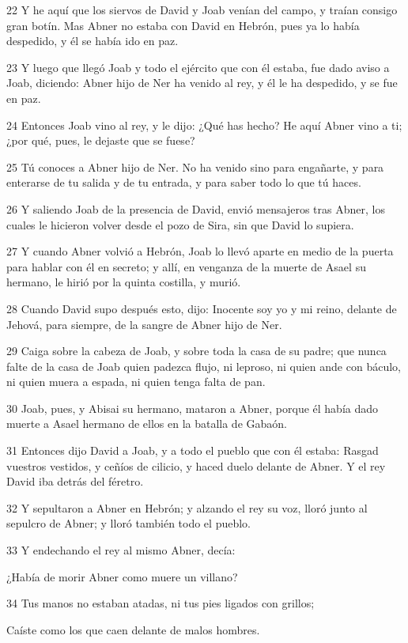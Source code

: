 \par 22 Y he aquí que los siervos de David y Joab venían del campo, y traían consigo gran botín. Mas Abner no estaba con David en Hebrón, pues ya lo había despedido, y él se había ido en paz.
\par 23 Y luego que llegó Joab y todo el ejército que con él estaba, fue dado aviso a Joab, diciendo: Abner hijo de Ner ha venido al rey, y él le ha despedido, y se fue en paz.
\par 24 Entonces Joab vino al rey, y le dijo: ¿Qué has hecho? He aquí Abner vino a ti; ¿por qué, pues, le dejaste que se fuese?
\par 25 Tú conoces a Abner hijo de Ner. No ha venido sino para engañarte, y para enterarse de tu salida y de tu entrada, y para saber todo lo que tú haces.
\par 26 Y saliendo Joab de la presencia de David, envió mensajeros tras Abner, los cuales le hicieron volver desde el pozo de Sira, sin que David lo supiera.
\par 27 Y cuando Abner volvió a Hebrón, Joab lo llevó aparte en medio de la puerta para hablar con él en secreto; y allí, en venganza de la muerte de Asael su hermano, le hirió por la quinta costilla, y murió.
\par 28 Cuando David supo después esto, dijo: Inocente soy yo y mi reino, delante de Jehová, para siempre, de la sangre de Abner hijo de Ner.
\par 29 Caiga sobre la cabeza de Joab, y sobre toda la casa de su padre; que nunca falte de la casa de Joab quien padezca flujo, ni leproso, ni quien ande con báculo, ni quien muera a espada, ni quien tenga falta de pan.
\par 30 Joab, pues, y Abisai su hermano, mataron a Abner, porque él había dado muerte a Asael hermano de ellos en la batalla de Gabaón.
\par 31 Entonces dijo David a Joab, y a todo el pueblo que con él estaba: Rasgad vuestros vestidos, y ceñíos de cilicio, y haced duelo delante de Abner. Y el rey David iba detrás del féretro.
\par 32 Y sepultaron a Abner en Hebrón; y alzando el rey su voz, lloró junto al sepulcro de Abner; y lloró también todo el pueblo. 
\par 33 Y endechando el rey al mismo Abner, decía:
\par ¿Había de morir Abner como muere un villano?
\par 34 Tus manos no estaban atadas, ni tus pies ligados con grillos;
\par Caíste como los que caen delante de malos hombres.
